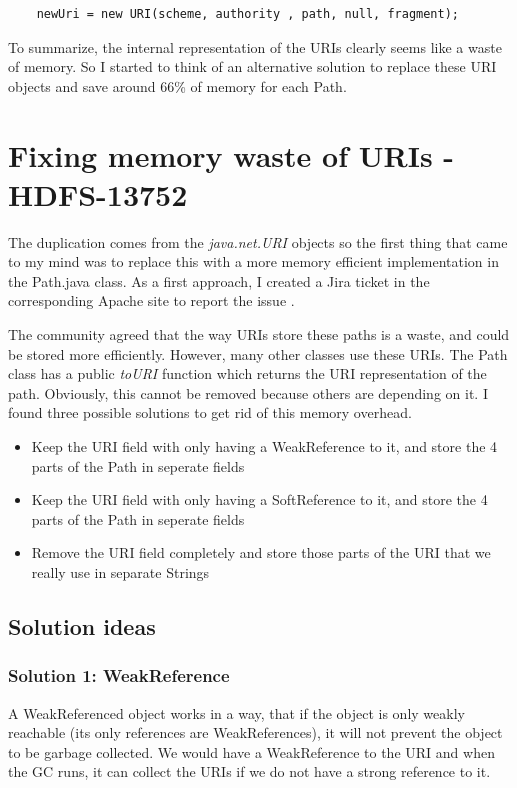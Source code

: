 \begin{lstlisting}
	newUri = new URI(scheme, authority , path, null, fragment);
\end{lstlisting}

To summarize, the internal representation of the URIs clearly seems like a waste of memory. So I started to think of an alternative solution to replace these URI objects and save around 66\% of memory for each Path. 

\chapter{Fixing memory waste of URIs - HDFS-13752}
The duplication comes from the \textit{java.net.URI} objects so the first thing that came to my mind was to replace this with a more memory efficient implementation in the Path.java class. As a first approach, I created a Jira ticket in the corresponding Apache site to report the issue \cite{hdfs-path}. 

The community agreed that the way URIs store these paths is a waste, and could be stored more efficiently. However, many other classes use these URIs. The Path class has a public \textit{toURI} function which returns the URI representation of the path. Obviously, this cannot be removed because others are depending on it. I found three possible solutions to get rid of this memory overhead.

\begin{itemize}
	\item Keep the URI field with only having a WeakReference to it, and store the 4 parts of the Path in seperate fields
	\item Keep the URI field with only having a SoftReference to it, and store the 4 parts of the Path in seperate fields
	\item Remove the URI field completely and store those parts of the URI that we really use in separate Strings
\end{itemize}
\section{Solution ideas}
\subsection{Solution 1: WeakReference}
A WeakReferenced object works in a way, that if the object is only weakly reachable (its only references are WeakReferences), it will not prevent the object to be garbage collected. We would have a WeakReference to the URI and when the GC runs, it can collect the URIs if we do not have a strong reference to it. 

